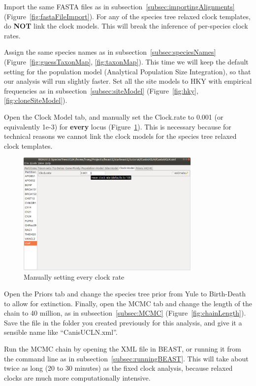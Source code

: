 \documentclass[12pt]{article}
\begin{document}
Import the same FASTA files as in
subsection~\ref{subsec:importingAlignments}
(Figure~\ref{fig:fastaFileImport}). For any of the species tree relaxed clock
templates, do \textbf{NOT} link the clock models. This will break the inference
of per-species clock rates.

Assign the same species names as in
subsection~\ref{subsec:speciesNames} (Figure~\ref{fig:guessTaxonMap}, \ref{fig:taxonMap}). This time
we will keep the default setting for the population model (Analytical Population
Size Integration), so that our analysis will run slightly faster. Set all
the site models to HKY with empirical frequencies as in
subsection~\ref{subsec:siteModel} (Figure~\ref{fig:hky}, \ref{fig:cloneSiteModel}).

Open the Clock Model tab, and manually set the Clock.rate to 0.001 (or
equivalently 1e-3) for \textbf{every} locus (Figure~\ref{fig:uclnClockRates}).
This is necessary because for technical reasons we cannot link the clock
models for the species tree relaxed clock templates.

\begin{figure}[htb!]
\centering
\includegraphics[width=0.8\textwidth]{figures/uclnClockRates.png}
\caption
{Manually setting every clock rate}
\label{fig:uclnClockRates}
\end{figure}

Open the Priors tab and change the species tree prior from Yule to Birth-Death
to allow for extinction. Finally, open the MCMC tab and change the length of
the chain to 40 million, as in subsection~\ref{subsec:MCMC}
(Figure~\ref{fig:chainLength}). Save the file in the folder you created
previously for this analysis, and give it a sensible name like ``CanisUCLN.xml''.

Run the MCMC chain by opening the XML file in BEAST, or running it from
the command line as in subsection~\ref{subsec:runningBEAST}. This will
take about twice as long (20 to 30 minutes) as the fixed clock analysis,
because relaxed clocks are much more computationally intensive.
\end{document}
